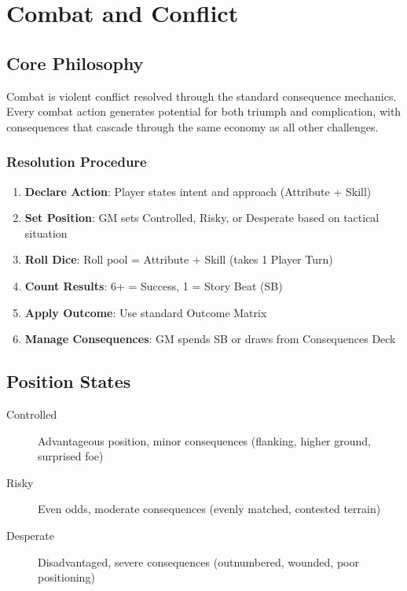 \chapter{Combat and Conflict}

\section{Core Philosophy}
Combat is violent conflict resolved through the standard consequence mechanics. Every combat action generates potential for both triumph and complication, with consequences that cascade through the same economy as all other challenges.

\subsection{Resolution Procedure}
\begin{enumerate}
    \item \textbf{Declare Action}: Player states intent and approach (Attribute + Skill)
    \item \textbf{Set Position}: GM sets Controlled, Risky, or Desperate based on tactical situation
    \item \textbf{Roll Dice}: Roll pool = Attribute + Skill (takes 1 Player Turn)
    \item \textbf{Count Results}: 6+ = Success, 1 = Story Beat (SB)
    \item \textbf{Apply Outcome}: Use standard Outcome Matrix
    \item \textbf{Manage Consequences}: GM spends SB or draws from Consequences Deck
\end{enumerate}

\section{Position States}
\begin{description}
\item[Controlled] Advantageous position, minor consequences (flanking, higher ground, surprised foe)
\item[Risky] Even odds, moderate consequences (evenly matched, contested terrain)
\item[Desperate] Disadvantaged, severe consequences (outnumbered, wounded, poor positioning)
\end{description}

